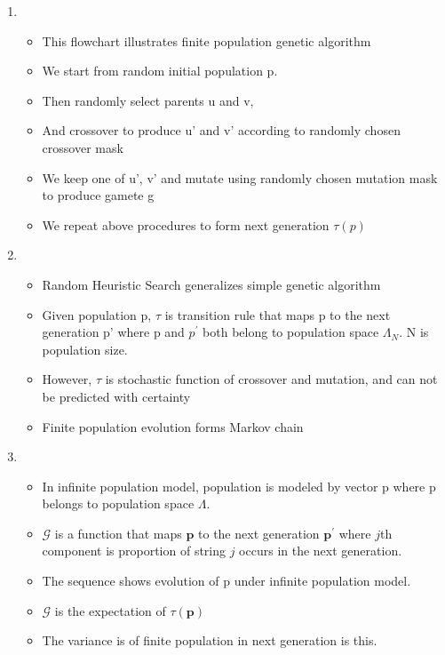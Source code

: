 \documentclass{article}
\begin{document}
\begin{enumerate}
\item
  \begin{itemize}
  \item This flowchart illustrates finite population genetic algorithm
  \item We start from random initial population p.
  \item Then randomly select parents u and v, 
  \item And crossover to produce u' and v' according to randomly chosen crossover mask
  \item We keep one of u', v' and mutate using randomly chosen mutation mask to produce gamete g
  \item We repeat above procedures to form next generation $\tau(p)$
  \end{itemize}
  
\item
  \begin{itemize}
  \item Random Heuristic Search generalizes simple genetic algorithm
  \item Given population p, $\tau$ is transition rule that maps p to
    the next generation p' where p and $p^\prime$ both belong to population space $\Lambda_N$.
    N is population size. 
    \item However, $\tau$ is stochastic function of crossover and
    mutation, and can not be predicted with
    certainty 
  \item Finite population evolution forms
    Markov chain
  
  \end{itemize}
    
\item
  \begin{itemize}
  \item In infinite population model, population is modeled by vector p where p belongs to population space $\Lambda$.    
  \item $\mathcal{G}$ is a function that maps $\bm{p}$ to the next
    generation $\bm{p}^\prime$ where $j$th component is proportion of string $j$
    occurs in the next generation.
  \item The sequence shows evolution of p under infinite population
    model.
    \item $\mathcal{G}$ is the expectation of $\tau(\bm{p})$
  \item The variance is of finite population in next generation is this.
  \end{itemize}
    

\end{enumerate}
\end{document}
